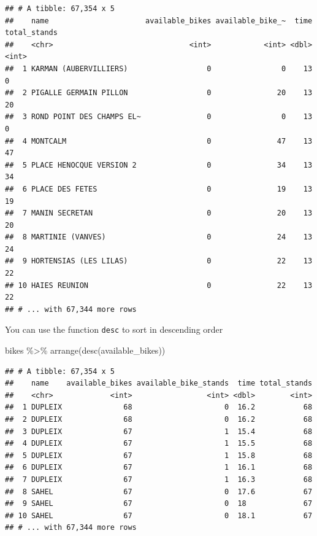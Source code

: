 \documentclass[
]{book}
\newenvironment{Shaded}{\begin{snugshade}}{\end{snugshade}}
\newcommand{\FunctionTok}[1]{\textcolor[rgb]{0.00,0.00,0.00}{#1}}
\newcommand{\NormalTok}[1]{#1}
\newcommand{\SpecialCharTok}[1]{\textcolor[rgb]{0.00,0.00,0.00}{#1}}
\begin{document}
\begin{verbatim}
## # A tibble: 67,354 x 5
##    name                      available_bikes available_bike_~  time total_stands
##    <chr>                               <int>            <int> <dbl>        <int>
##  1 KARMAN (AUBERVILLIERS)                  0                0    13            0
##  2 PIGALLE GERMAIN PILLON                  0               20    13           20
##  3 ROND POINT DES CHAMPS EL~               0                0    13            0
##  4 MONTCALM                                0               47    13           47
##  5 PLACE HENOCQUE VERSION 2                0               34    13           34
##  6 PLACE DES FETES                         0               19    13           19
##  7 MANIN SECRETAN                          0               20    13           20
##  8 MARTINIE (VANVES)                       0               24    13           24
##  9 HORTENSIAS (LES LILAS)                  0               22    13           22
## 10 HAIES REUNION                           0               22    13           22
## # ... with 67,344 more rows
\end{verbatim}

You can use the function \texttt{desc} to sort in descending order

\begin{Shaded}
\begin{Highlighting}[]
\NormalTok{bikes }\SpecialCharTok{\%\textgreater{}\%}
  \FunctionTok{arrange}\NormalTok{(}\FunctionTok{desc}\NormalTok{(available\_bikes))}
\end{Highlighting}
\end{Shaded}

\begin{verbatim}
## # A tibble: 67,354 x 5
##    name    available_bikes available_bike_stands  time total_stands
##    <chr>             <int>                 <int> <dbl>        <int>
##  1 DUPLEIX              68                     0  16.2           68
##  2 DUPLEIX              68                     0  16.2           68
##  3 DUPLEIX              67                     1  15.4           68
##  4 DUPLEIX              67                     1  15.5           68
##  5 DUPLEIX              67                     1  15.8           68
##  6 DUPLEIX              67                     1  16.1           68
##  7 DUPLEIX              67                     1  16.3           68
##  8 SAHEL                67                     0  17.6           67
##  9 SAHEL                67                     0  18             67
## 10 SAHEL                67                     0  18.1           67
## # ... with 67,344 more rows
\end{verbatim}
\end{document}
